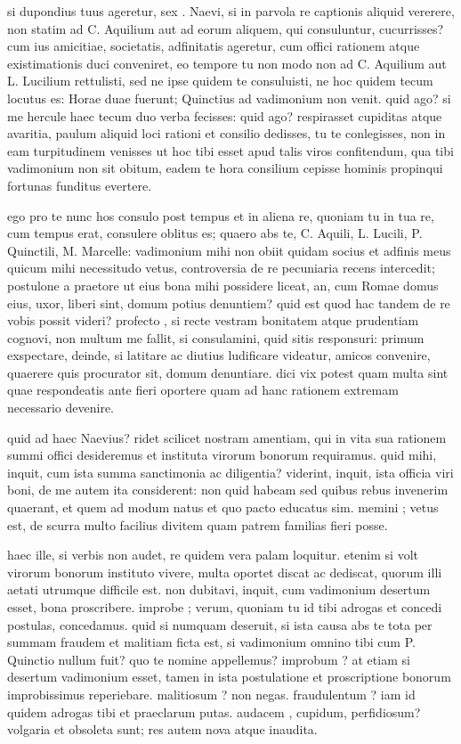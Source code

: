  si dupondius tuus ageretur, sex . Naevi, si in parvola re captionis aliquid vererere, non statim ad C. Aquilium aut ad eorum aliquem, qui consuluntur, cucurrisses? cum ius amicitiae, societatis, adfinitatis ageretur, cum offici rationem atque existimationis duci conveniret, eo tempore tu non modo non ad C. Aquilium aut L. Lucilium rettulisti, sed ne ipse quidem te consuluisti, ne hoc quidem tecum locutus es: Horae duae fuerunt; Quinctius ad vadimonium non venit. quid ago? si me hercule haec tecum duo verba fecisses: quid ago? respirasset cupiditas atque avaritia, paulum aliquid loci rationi et consilio dedisses, tu te conlegisses, non in eam turpitudinem venisses ut hoc tibi esset apud talis viros confitendum, qua tibi vadimonium non sit obitum, eadem te hora consilium cepisse hominis propinqui fortunas funditus evertere.

 ego pro te nunc hos consulo post tempus et in aliena re, quoniam tu in tua re, cum tempus erat, consulere oblitus es; quaero abs te, C. Aquili, L. Lucili, P. Quinctili, M. Marcelle: vadimonium mihi non obiit quidam socius et adfinis meus quicum mihi necessitudo vetus, controversia de re pecuniaria recens intercedit; postulone a praetore ut eius bona mihi possidere liceat, an, cum Romae domus eius, uxor, liberi sint, domum potius denuntiem? quid est quod hac tandem de re vobis possit videri? profecto , si recte vestram bonitatem atque prudentiam cognovi, non multum me fallit, si consulamini, quid sitis responsuri: primum exspectare, deinde, si latitare ac diutius ludificare videatur, amicos convenire, quaerere quis procurator sit, domum denuntiare. dici vix potest quam multa sint quae respondeatis ante fieri oportere quam ad hanc rationem extremam necessario devenire.

 quid ad haec Naevius? ridet scilicet nostram amentiam, qui in vita sua rationem summi offici desideremus et instituta virorum bonorum requiramus. quid mihi, inquit, cum ista summa sanctimonia ac diligentia? viderint, inquit, ista officia viri boni, de me autem ita considerent: non quid habeam sed quibus rebus invenerim quaerant, et quem ad modum natus et quo pacto educatus sim. memini ; vetus est, de scurra multo facilius divitem quam patrem familias fieri posse.

 haec ille, si verbis non audet, re quidem vera palam loquitur. etenim si volt virorum bonorum instituto vivere, multa oportet discat ac dediscat, quorum illi aetati utrumque difficile est. non dubitavi, inquit, cum vadimonium desertum esset, bona proscribere. improbe ; verum, quoniam tu id tibi adrogas et concedi postulas, concedamus. quid si numquam deseruit, si ista causa abs te tota per summam fraudem et malitiam ficta est, si vadimonium omnino tibi cum P. Quinctio nullum fuit? quo te nomine appellemus? improbum ? at etiam si desertum vadimonium esset, tamen in ista postulatione et proscriptione bonorum improbissimus reperiebare. malitiosum ? non negas. fraudulentum ? iam id quidem adrogas tibi et praeclarum putas. audacem , cupidum, perfidiosum? volgaria et obsoleta sunt; res autem nova atque inaudita.

